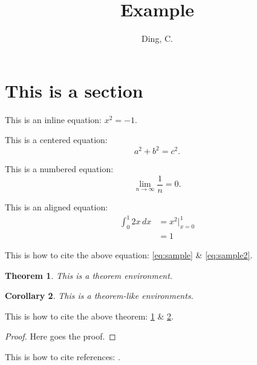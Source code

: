 \documentclass{article}
\title{Example}
\author{Ding, C.}
\date{}
\newtheorem{theorem}{Theorem}
\newtheorem{corollary}[theorem]{Corollary}
\begin{document}
\section{This is a section}

This is an inline equation: $x^2=-1$.

This is a centered equation: $$a^2+b^2=c^2.$$

This is a numbered equation: 
\begin{equation}
\lim_{n\to\infty}\frac{1}{n}=0.
\label{eq:sample}
\end{equation}

This is an aligned equation:
\begin{align}
	\int_{0}^{1}2x\,dx 
	&=x^2\Big|_{x=0}^1\label{eq:sample2}\\
	&=1
\end{align}

	
This is how to cite the above equation: \eqref{eq:sample} \& \eqref{eq:sample2}.

\begin{theorem} \label{thm:sample}
	This is a theorem environment.
\end{theorem}

\begin{corollary}\label{corollary}
	This is a theorem-like environments.
\end{corollary}

This is how to cite the above theorem: \ref{thm:sample} \& \ref{corollary}.

\begin{proof}
	Here goes the proof.
\end{proof}

This is how to cite references: \cite{mac2013categories}.





\end{document}
